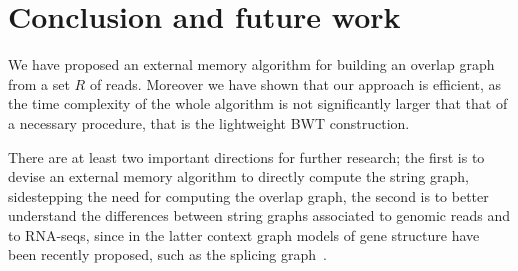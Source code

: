 \documentclass[runningheads,envcountsame,a4paper]{llncs}
\begin{document}
\section{Conclusion and future work}
%

We have  proposed an external memory algorithm for building an overlap  graph from a set $R$ of reads.
Moreover we have shown that our approach is efficient, as the time complexity of
the whole algorithm is not significantly larger that that of a necessary
procedure, that is the lightweight BWT construction.

There are at least two important directions for further research; the first is
to devise an external memory algorithm to directly compute the string graph,
sidestepping the need for computing the overlap graph, the second is to
better understand the differences between string graphs associated to genomic
reads and to RNA-seqs, since in the latter context graph models of gene structure
have been recently proposed, such as the splicing graph~\cite{Beretta2013}.



\end{document}

